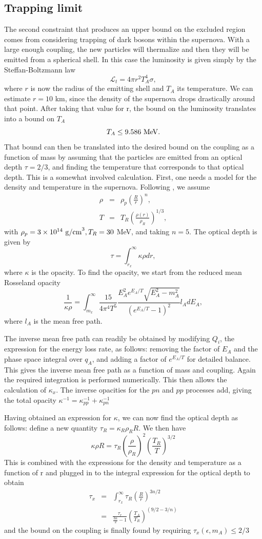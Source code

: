 \documentclass[nofootinbib,aps,prd,preprint,superscriptaddress]{revtex4}
\newcommand{\beq}{\begin{equation}}
\newcommand{\eeq}{\end{equation}}
\newcommand{\bea}{\begin{eqnarray}}
\newcommand{\eea}{\end{eqnarray}}
\begin{document}
\subsection{Trapping limit}
The second constraint that produces an upper bound on the excluded region comes from considering trapping of dark bosons within the supernova. With a large enough coupling, the new particles will thermalize and then they will be emitted from a spherical shell.  In this case the luminosity is given simply by the Steffan-Boltzmann law
\beq
\mathcal{L}_t  = 4\pi r^2 T_A^4 \sigma,
\eeq
where $ r $ is now the radius of the emitting shell and $ T_A $ its temperature. We can estimate $ r = 10$ km, since the density of the supernova drops drastically around that point. After taking that value for r, the bound on the luminosity translates into a bound on $ T_A $ 
\beq
T_A \le 9.586\rm\ MeV.
\eeq
That bound can then be translated into the desired bound on the coupling as a function of mass by assuming that the particles are emitted from an optical depth $ \tau = 2/3 $, and finding the temperature that corresponds to that optical depth. This is a somewhat involved calculation.
First, one needs a model for the density and temperature in the supernova. Following \cite{Dent:2012mx}, we assume 
\bea
\rho &=& \rho_p \left(\frac{R}{r}\right)^n,\\
T &=& T_R \left(\frac{\rho(r)}{\rho_R}\right)^{1/3},
\eea
with $  \rho_p  = 3\times10^{14}\ {\rm g/cm}^3, T_R = 30$ MeV, and taking $ n = 5 $. The optical depth is given by 
\beq
\tau = \int_{r_x}^{\infty} \kappa \rho dr,
\eeq
where $ \kappa$ is the opacity.  To find the opacity, we start from the reduced mean Rosseland opacity 
\beq
\frac{1}{\kappa \rho} = \int_{m_x}^{\infty} \frac{15}{4 \pi^4 T^5} \frac{E_A^2 e^{E_A/T} \sqrt{E_A^2 - m_A^2}}{(e^{E_A/T}-1)^2} l_A dE_A,
\eeq
where $ l_A $ is the mean free path. 
	
The inverse mean free path can readily be obtained by modifying $ Q_i $, the expression for the energy loss rate, as follows: removing the factor of $ E_A $ and the phase space integral over $ q_A $, and adding a factor of $ e^{E_A/T} $ for detailed balance. This gives the inverse mean free path as a function of mass and coupling. Again the required integration is performed numerically. This then allows the calculation of $ \kappa_x $. The inverse opacities for the $pn$ and $pp$ processes add, giving the total opacity $ \kappa^{-1} = \kappa_{pp}^{-1} + \kappa_{pn}^{-1} $
	
Having obtained an expression for $ \kappa $, we can now find the optical depth as follows: define a new quantity $ \tau_R = \kappa_R \rho_R R $. We then have 
\beq \kappa \rho R = \tau_R (\frac{\rho}{\rho_R})^2 (\frac{T_R}{T})^{3/2}  \eeq
This is combined with the expressions for the density and temperature as a function of r and plugged in to the integral expression for the optical depth to obtain 
\bea \tau_x &=& \int_{r_x}^{\infty} \tau_R (\frac{R}{r})^{3n/2} \\
 &=& \frac{\tau_r}{\frac{3n}{2}-1} (\frac{T_A}{T_R})^{(9/2-3/n)} \eea
and the bound on the coupling is finally found by requiring  $ \tau_x(\epsilon,m_A) \le 2/3 $
	
\end{document}
